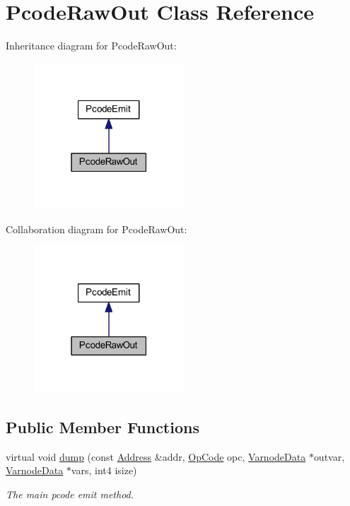 \hypertarget{class_pcode_raw_out}{}\section{Pcode\+Raw\+Out Class Reference}
\label{class_pcode_raw_out}


Inheritance diagram for Pcode\+Raw\+Out\+:
\nopagebreak
\begin{figure}[H]
\begin{center}
\leavevmode
\includegraphics[width=159pt]{class_pcode_raw_out__inherit__graph}
\end{center}
\end{figure}


Collaboration diagram for Pcode\+Raw\+Out\+:
\nopagebreak
\begin{figure}[H]
\begin{center}
\leavevmode
\includegraphics[width=159pt]{class_pcode_raw_out__coll__graph}
\end{center}
\end{figure}
\subsection*{Public Member Functions}
\begin{DoxyCompactItemize}
\item 
virtual void \mbox{\hyperlink{class_pcode_raw_out_a69df78fbc3cdae072cdd8938c88bb4b3}{dump}} (const \mbox{\hyperlink{class_address}{Address}} \&addr, \mbox{\hyperlink{opcodes_8hh_abeb7dfb0e9e2b3114e240a405d046ea7}{Op\+Code}} opc, \mbox{\hyperlink{struct_varnode_data}{Varnode\+Data}} $\ast$outvar, \mbox{\hyperlink{struct_varnode_data}{Varnode\+Data}} $\ast$vars, int4 isize)
\begin{DoxyCompactList}\small\item\em The main pcode emit method. \end{DoxyCompactList}\end{DoxyCompactItemize}
